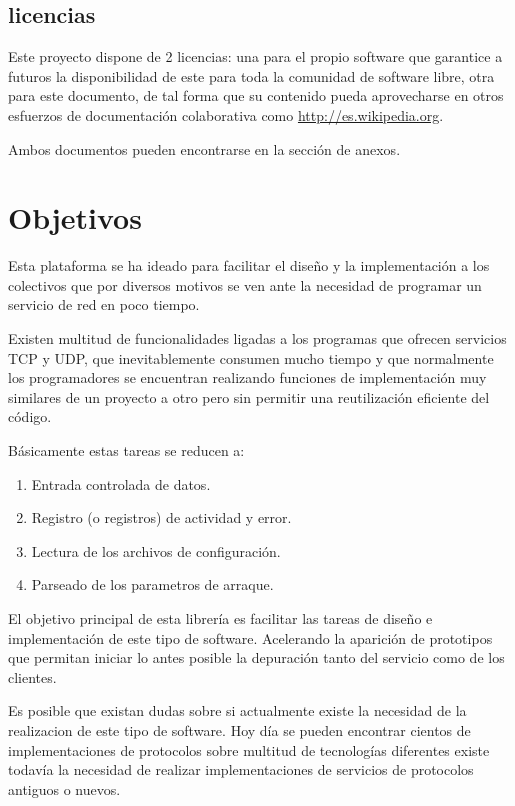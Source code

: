 \documentclass[a4paper,spanish,12pt]{book}
\begin{document}
\section{licencias}
Este proyecto dispone de 2 licencias: una para el propio software que garantice a futuros la disponibilidad de este para toda la comunidad de software libre, otra para este documento, de tal forma que su contenido pueda aprovecharse en otros esfuerzos de documentación colaborativa como \url{http://es.wikipedia.org}.

Ambos documentos pueden encontrarse en la sección de anexos.
\chapter{Objetivos}

Esta plataforma se ha ideado para facilitar el diseño y la implementación a los colectivos que por diversos motivos se ven ante la necesidad de programar un servicio de red en poco tiempo. 

Existen multitud de funcionalidades ligadas a los programas que ofrecen servicios TCP y UDP, que inevitablemente consumen mucho tiempo y que normalmente los programadores se encuentran realizando funciones de implementación muy similares de un proyecto a otro pero sin permitir una reutilización eficiente del código.

Básicamente estas tareas se reducen a:
\begin{enumerate}
	\item Entrada controlada de datos.
	\item Registro (o registros) de actividad y error.
	\item Lectura de los archivos de configuraci\'on.
	\item Parseado de los parametros de arraque.
\end{enumerate}

El objetivo principal de esta librería es facilitar las tareas de diseño e implementación de este tipo de software. Acelerando la aparición de prototipos que permitan iniciar lo antes posible la depuración tanto del servicio como de los clientes.

Es posible que existan dudas sobre si actualmente existe la necesidad de la realizacion de este tipo de software. Hoy día se pueden encontrar cientos de implementaciones de protocolos sobre multitud de tecnologías diferentes existe todavía la necesidad de realizar implementaciones de servicios de protocolos antiguos o nuevos.
\end{document}
